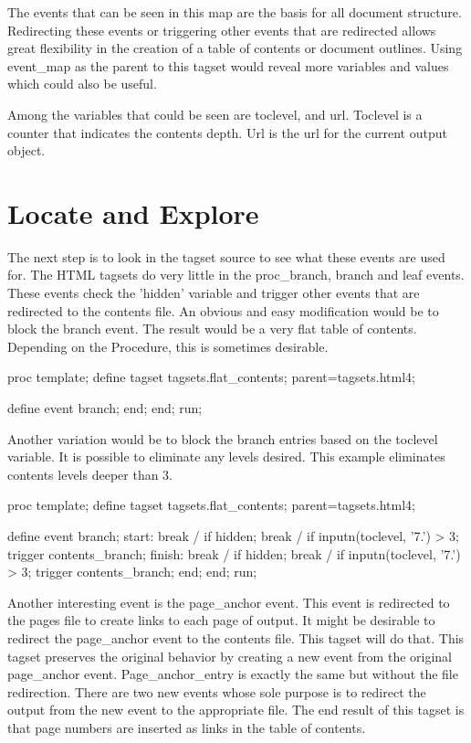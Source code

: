 The events that can be seen in this map are the basis for all document
structure.  Redirecting these events or triggering other events that
are redirected allows great flexibility in the creation of a table of
contents or document outlines.  Using event\_map as the parent to this
tagset would reveal more variables and values which could also be useful.

Among the variables that could be seen are toclevel, and url.
Toclevel is a counter that indicates the contents depth.  Url is 
the url for the current output object.  

\section{Locate and Explore}
The next step is to look in the tagset source to see what these events
are used for.  The HTML tagsets do very little in the proc\_branch, branch 
and leaf events. These events check the 'hidden' variable and trigger other events 
that are redirected to the 
contents file.  An obvious and easy modification would be to block
the branch event.  The result would be a very flat table of contents.
Depending on the Procedure, this is sometimes desirable.

\begin{sfvcode}
proc template;
    define tagset tagsets.flat_contents;
        parent=tagsets.html4;
 
        define event branch;
        end;
    end;
run;
\end{sfvcode}

Another variation would be to block the branch entries based on the toclevel
variable.  It is possible to eliminate any levels desired.  This example eliminates
contents levels deeper than 3.

\begin{sfvcode}
proc template;
    define tagset tagsets.flat_contents;
        parent=tagsets.html4;
 
        define event branch;
            start:
                break / if hidden;
                break / if inputn(toclevel, '7.') > 3;
                trigger contents_branch;
            finish:
                break / if hidden;
                break / if inputn(toclevel, '7.') > 3;
                trigger contents_branch;
        end;
    end;
run;
\end{sfvcode}

Another interesting event is the page\_anchor event.  This event is redirected
to the pages file to create links to each page of output.  It might be desirable
to redirect the page\_anchor event to the contents file.  This tagset will do that.
This tagset preserves the original behavior by creating a new event from the original
page\_anchor event.  Page\_anchor\_entry is exactly the same but without the file 
redirection.  There are two new events whose sole purpose is to redirect the output
from the new event to the appropriate file.  The end result of this tagset is that
page numbers are inserted as links in the table of contents.

